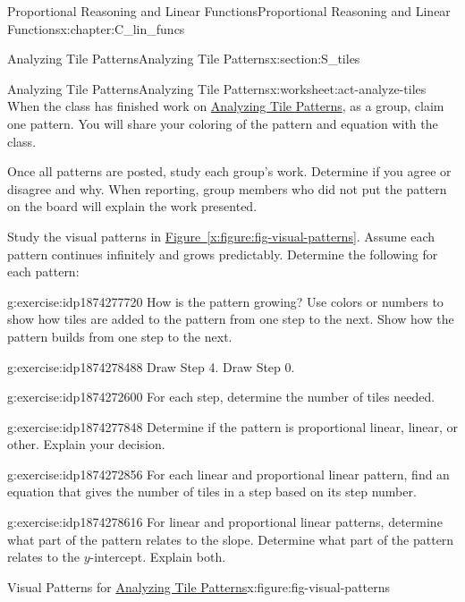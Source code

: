 \documentclass[oneside,10pt,]{book}
\newcommand{\xreffont}{\relax}
\numberwithin{equation}{chapter}
\begin{document}
\begin{chapterptx}{Proportional Reasoning and Linear Functions}{}{Proportional Reasoning and Linear Functions}{}{}{x:chapter:C_lin_funcs}
\begin{sectionptx}{Analyzing Tile Patterns}{}{Analyzing Tile Patterns}{}{}{x:section:S_tiles}
\begin{worksheet-subsection}{Analyzing Tile Patterns}{}{Analyzing Tile Patterns}{}{}{x:worksheet:act-analyze-tiles}
When the class has finished work on \hyperref[x:worksheet:act-analyze-tiles]{Analyzing Tile Patterns}, as a group, claim one pattern. You will share your coloring of the pattern and equation with the class.%
\par
Once all patterns are posted, study each group's work. Determine if you agree or disagree and why. When reporting, group members who did not put the pattern on the board will explain the work presented.%
\par
Study the visual patterns in \hyperref[x:figure:fig-visual-patterns]{Figure~{\xreffont\ref{x:figure:fig-visual-patterns}}}. Assume each pattern continues infinitely and grows predictably. Determine the following for each pattern:%
\begin{divisionexercise}{1}{}{}{g:exercise:idp1874277720}%
How is the pattern growing? Use colors or numbers to show how tiles are added to the pattern from one step to the next. Show how the pattern builds from one step to the next.%
\end{divisionexercise}%
\begin{divisionexercise}{2}{}{}{g:exercise:idp1874278488}%
Draw Step 4. Draw Step 0.%
\end{divisionexercise}%
\begin{divisionexercise}{3}{}{}{g:exercise:idp1874272600}%
For each step, determine the number of tiles needed.%
\end{divisionexercise}%
\begin{divisionexercise}{4}{}{}{g:exercise:idp1874277848}%
Determine if the pattern is proportional linear, linear, or other. Explain your decision.%
\end{divisionexercise}%
\begin{divisionexercise}{5}{}{}{g:exercise:idp1874272856}%
For each linear and proportional linear pattern, find an equation that gives the number of tiles in a step based on its step number.%
\end{divisionexercise}%
\begin{divisionexercise}{6}{}{}{g:exercise:idp1874278616}%
For linear and proportional linear patterns, determine what part of the pattern relates to the slope. Determine what part of the pattern relates to the \(y\)-intercept. Explain both.%
\end{divisionexercise}%
\clearpage
\begin{figureptx}{Visual Patterns for \hyperref[x:worksheet:act-analyze-tiles]{Analyzing Tile Patterns}}{x:figure:fig-visual-patterns}{}%
\begin{image}{0}{1}{0}%

\end{image}
\end{figureptx}
\end{worksheet-subsection}
\end{sectionptx}
\end{chapterptx}
\end{document}
